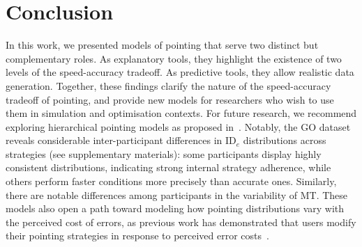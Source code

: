 \documentclass[acmlarge, manuscript,review]{acmart}
\newcommand{\ide}{\ensuremath{{\text{ID}_e}}\xspace}
\begin{document}
\section{Conclusion}
In this work, we presented models of pointing that serve two distinct but complementary roles. As explanatory tools, they highlight the existence of two levels of the speed-accuracy tradeoff. As predictive tools, they allow realistic data generation.
Together, these findings clarify the nature of the speed-accuracy tradeoff of pointing, and provide new models for researchers who wish to use them in simulation and optimisation contexts.
For future research, we recommend exploring hierarchical pointing models as proposed in~\cite{zhao2022}. Notably, the GO dataset reveals considerable inter-participant differences in \ide distributions across strategies (see supplementary materials): some participants display highly consistent distributions, indicating strong internal strategy adherence, while others perform faster conditions more precisely than accurate ones. Similarly, there are notable differences among participants in the variability of MT.
These models also open a path toward modeling how pointing distributions vary with the perceived cost of errors, as previous work has demonstrated that users modify their pointing strategies in response to perceived error costs~\cite{bertucco2015}.
\end{document}
